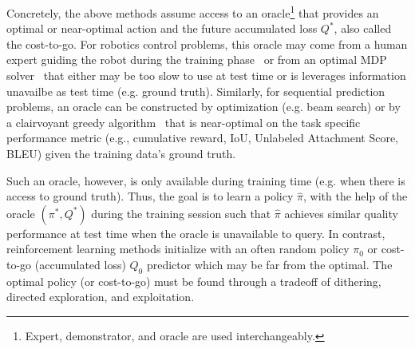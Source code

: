 \documentclass{article}
\begin{document}
Concretely, the above methods assume access to an oracle\footnote{Expert, demonstrator, and oracle are used interchangeably.} that provides an optimal or near-optimal action and the future accumulated loss $Q^*$, also called the cost-to-go. For robotics control problems, this oracle may come from a human expert guiding the robot during the training phase~ \cite{abbeel2004apprenticeship} or from an optimal MDP solver~\cite{Ross2011_AISTATS,kahn2016plato} that either may be too slow to use at test time or is leverages information unavailbe as test time (e.g. ground truth). Similarly, for sequential prediction problems, an oracle can be constructed by optimization (e.g. beam search) or by a clairvoyant greedy algorithm~\cite{daume2009search,ross2013contextual,rhinehart2015visual,chang2015learning_dependency} that is near-optimal on the task specific performance metric (e.g., cumulative reward, IoU, Unlabeled Attachment Score, BLEU) given the training data's ground truth.

Such an oracle, however, is only available during training time (e.g. when there is access to ground truth). Thus, the goal is to learn a policy $\hat \pi$, with the help of the oracle $(\pi^*, Q^*)$ during the training session such that $\hat \pi$ achieves similar quality performance at test time when the oracle is unavailable to query. In contrast, reinforcement learning methods initialize with an often random policy $\pi_0$ or cost-to-go (accumulated loss) $Q_0$ predictor which may be far from the optimal. The optimal policy (or cost-to-go) must be found through a tradeoff of dithering, directed exploration, and exploitation.

\end{document}
